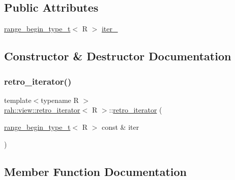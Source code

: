 \subsection*{Public Attributes}
\begin{DoxyCompactItemize}
\item 
\mbox{\hyperlink{namespacerah_afa7f59d1f37c7b9d9caed37551be9eaa}{range\+\_\+begin\+\_\+type\+\_\+t}}$<$ R $>$ \mbox{\hyperlink{structrah_1_1view_1_1retro__iterator_a8c21328b89b978842df7951af4022393}{iter\+\_\+}}
\end{DoxyCompactItemize}


\subsection{Constructor \& Destructor Documentation}
\mbox{\label{structrah_1_1view_1_1retro__iterator_ad7369163c4bbabf1e8699fd5ec8f96c8}} 
\subsubsection{\texorpdfstring{retro\_iterator()}{retro\_iterator()}}
{\footnotesize\ttfamily template$<$typename R $>$ \\
\mbox{\hyperlink{structrah_1_1view_1_1retro__iterator}{rah\+::view\+::retro\+\_\+iterator}}$<$ R $>$\+::\mbox{\hyperlink{structrah_1_1view_1_1retro__iterator}{retro\+\_\+iterator}} (\begin{DoxyParamCaption}\item[{\mbox{\hyperlink{namespacerah_afa7f59d1f37c7b9d9caed37551be9eaa}{range\+\_\+begin\+\_\+type\+\_\+t}}$<$ R $>$ const \&}]{iter }\end{DoxyParamCaption})\hspace{0.3cm}{\ttfamily [inline]}}



\subsection{Member Function Documentation}
\mbox{\label{structrah_1_1view_1_1retro__iterator_a5f70f5e51fe8e6c47cbeac7c8fa2a9d2}} 
